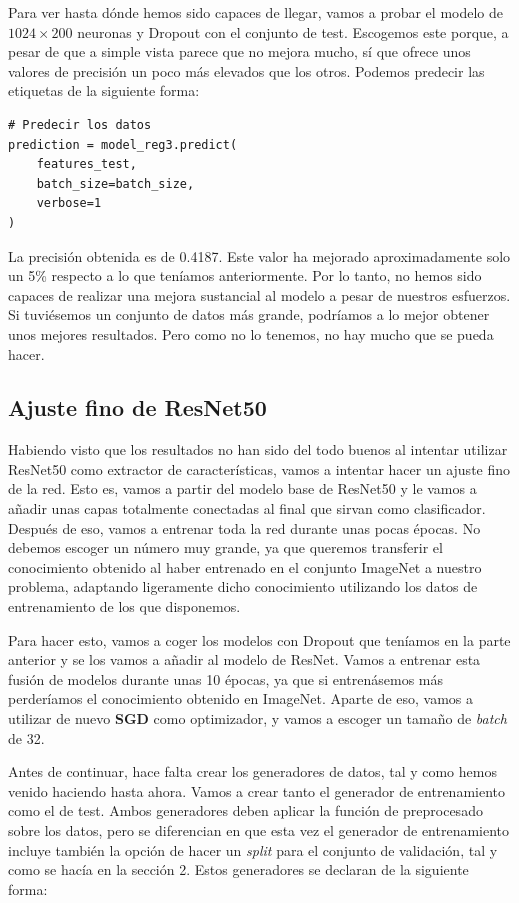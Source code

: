 \documentclass[11pt,a4paper]{article}
\begin{document}
Para ver hasta dónde hemos sido capaces de llegar, vamos a probar el modelo de $1024 \times 200$ neuronas
y Dropout con el conjunto de test. Escogemos este porque, a pesar de que a simple vista parece que no mejora
mucho, sí que ofrece unos valores de precisión un poco más elevados que los otros. Podemos predecir
las etiquetas de la siguiente forma:

\begin{lstlisting}
# Predecir los datos
prediction = model_reg3.predict(
    features_test,
    batch_size=batch_size,
    verbose=1
)
\end{lstlisting}

La precisión obtenida es de 0.4187. Este valor ha mejorado aproximadamente solo un 5\% respecto
a lo que teníamos anteriormente. Por lo tanto, no hemos sido capaces de realizar una mejora
sustancial al modelo a pesar de nuestros esfuerzos. Si tuviésemos un conjunto de datos más
grande, podríamos a lo mejor obtener unos mejores resultados. Pero como no lo tenemos,
no hay mucho que se pueda hacer.

\subsection{Ajuste fino de ResNet50}

Habiendo visto que los resultados no han sido del todo buenos al intentar utilizar ResNet50
como extractor de características, vamos a intentar hacer un ajuste fino de la red. Esto es, vamos
a partir del modelo base de ResNet50 y le vamos a añadir unas capas totalmente conectadas al final
que sirvan como clasificador. Después de eso, vamos a entrenar toda la red durante unas pocas épocas.
No debemos escoger un número muy grande, ya que queremos transferir el conocimiento obtenido al haber
entrenado en el conjunto ImageNet a nuestro problema, adaptando ligeramente dicho conocimiento utilizando
los datos de entrenamiento de los que disponemos.

Para hacer esto, vamos a coger los modelos con Dropout que teníamos en la parte anterior y
se los vamos a añadir al modelo de ResNet. Vamos a entrenar esta fusión de modelos durante
unas 10 épocas, ya que si entrenásemos más perderíamos el conocimiento obtenido en ImageNet.
Aparte de eso, vamos a utilizar de nuevo \textbf{SGD} como optimizador, y vamos a escoger
un tamaño de \textit{batch} de 32.

Antes de continuar, hace falta crear los generadores de datos, tal y como hemos venido haciendo
hasta ahora. Vamos a crear tanto el generador de entrenamiento como el de test. Ambos generadores deben
aplicar la función de preprocesado sobre los datos, pero se diferencian en que esta vez el generador
de entrenamiento incluye también la opción de hacer un \textit{split} para el conjunto de validación,
tal y como se hacía en la sección 2. Estos generadores se declaran de la siguiente forma:
\end{document}
